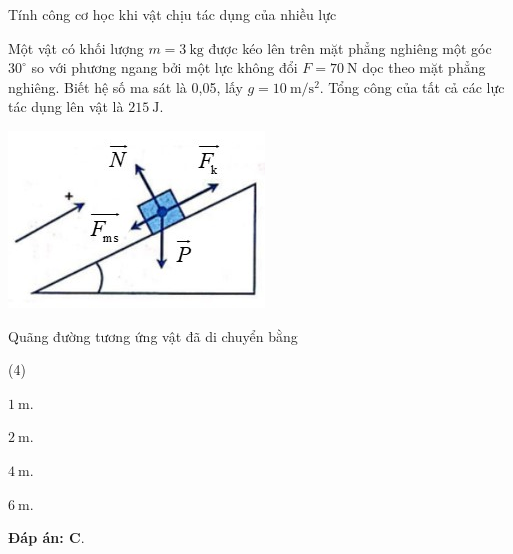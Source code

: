 \begin{dang}{Tính công cơ học khi vật chịu tác dụng của nhiều lực}
{			Một vật có khối lượng $m=\SI{3}{\kilogram}$ được kéo lên trên mặt phẳng nghiêng một góc $30^\circ$ so với phương ngang bởi một lực không đổi $F=\SI{70}{\newton}$ dọc theo mặt phẳng nghiêng. Biết hệ số ma sát là 0,05, lấy $g=\SI{10}{\meter/\second^2}$. Tổng công của tất cả các lực tác dụng lên vật là $\SI{215}{\joule}$.
			\begin{center}
				\includegraphics[scale=0.6]{../figs/VN10-PH-30-P-022-1-H2.jpg}
			\end{center}
			Quãng đường tương ứng vật đã di chuyển bằng
			\begin{mcq}(4)
				\item $\SI{1}{\meter}$.
				\item $\SI{2}{\meter}$.
				\item $\SI{4}{\meter}$.
				\item $\SI{6}{\meter}$.
			\end{mcq}
			
			\textbf{Đáp án: C}.
		}
	\end{dang}

